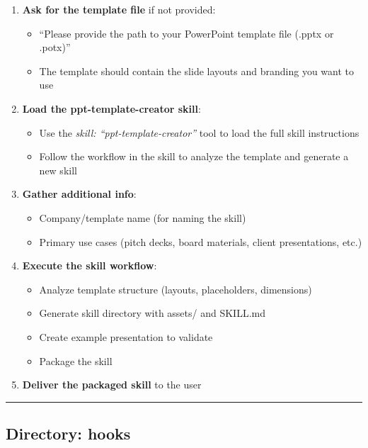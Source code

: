 \documentclass[11pt]{article}
\begin{document}
\begin{enumerate}[leftmargin=*,itemsep=2pt,topsep=2pt]
\item {} \textbf{Ask for the template file} if not provided:
\begin{itemize}[leftmargin=*,itemsep=2pt,topsep=2pt]
\item {} ``Please provide the path to your PowerPoint template file (.pptx or .potx)''
\item {} The template should contain the slide layouts and branding you want to use
\end{itemize}
\item {} \textbf{Load the ppt-template-creator skill}:
\begin{itemize}[leftmargin=*,itemsep=2pt,topsep=2pt]
\item {} Use the \emph{skill: ``ppt-template-creator''} tool to load the full skill instructions
\item {} Follow the workflow in the skill to analyze the template and generate a new skill
\end{itemize}
\item {} \textbf{Gather additional info}:
\begin{itemize}[leftmargin=*,itemsep=2pt,topsep=2pt]
\item {} Company/template name (for naming the skill)
\item {} Primary use cases (pitch decks, board materials, client presentations, etc.)
\end{itemize}
\item {} \textbf{Execute the skill workflow}:
\begin{itemize}[leftmargin=*,itemsep=2pt,topsep=2pt]
\item {} Analyze template structure (layouts, placeholders, dimensions)
\item {} Generate skill directory with assets/ and SKILL.md
\item {} Create example presentation to validate
\item {} Package the skill
\end{itemize}
\item {} \textbf{Deliver the packaged skill} to the user
\end{enumerate}

\vspace{0.8em}\hrule\vspace{0.8em}

\subsection{Directory: hooks}
\end{document}
